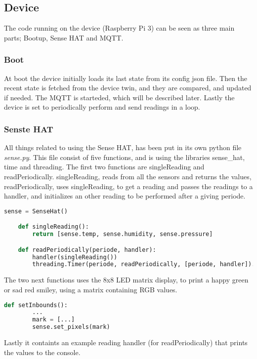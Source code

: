 \subsection{Device}
The code running on the device (Raspberry Pi 3) can be seen as three main parts; Bootup, Sense HAT and MQTT.

\subsubsection*{Boot}
At boot the device initially loads its last state from its config json file. Then the recent state is fetched from the device twin, and they are compared, and updated if needed. The MQTT is starteded, which will be described later. Lastly the device is set to periodically perform and send readings in a loop. 

\subsubsection*{Senste HAT}
All things related to using the Sense HAT, has been put in its own python file \textit{sense.py}. This file consist of five functions, and is using the libraries sense\_hat, time and threading.
The first two functions are singleReading and readPeriodically. singleReading, reads from all the sensors and returns the values, readPeriodically, uses singleReading, to get a reading and passes the readings to a handler, and initializes an other reading to be performed after a giving periode.
\begin{lstlisting}[language=Python, caption=Python reading from sensehat, label={lst:rprfsh}, basicstyle=\scriptsize]
    sense = SenseHat()

    def singleReading():
        return [sense.temp, sense.humidity, sense.pressure]   

    def readPeriodically(periode, handler): 
        handler(singleReading())
        threading.Timer(periode, readPeriodically, [periode, handler]).start()
\end{lstlisting}
The two next functions uses the 8x8 LED matrix display, to print a happy green or sad red smiley, using a matrix containing RGB values.
\begin{lstlisting}[language=Python, caption=example of setting LED matrix, label={lst:rpslm}, basicstyle=\scriptsize]
    def setInbounds():
        ...
        mark = [...]
        sense.set_pixels(mark)
\end{lstlisting}
Lastly it containts an example reading handler (for readPeriodically) that prints the values to the console.

